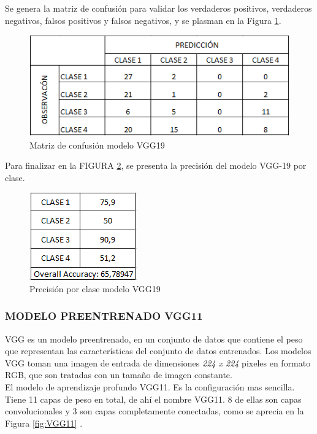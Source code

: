 			Se genera la matriz de confusión para validar los verdaderos positivos, verdaderos negativos, falsos positivos y falsos negativos, y se plasman en la Figura \ref{fig:MC_VGG19}.
		
			\begin{figure}[ht]
				\centering
				\includegraphics[scale=0.5]{Figs/131.png}
				\caption{Matriz de confusión modelo VGG19}
				\label{fig:MC_VGG19}
			\end{figure}
			
			Para finalizar en la FIGURA \ref{fig:ACU_VGG19}, se presenta la precisión del modelo VGG-19 por clase.
		
			\begin{figure}[ht]
				\centering
				\includegraphics[scale=0.6]{Figs/132.png}
				\caption{Precisión por clase modelo VGG19}
				\label{fig:ACU_VGG19}
			\end{figure}
		
			\newpage
			\subsubsection{\MakeUppercase{Modelo preentrenado VGG11}}
			VGG es un modelo preentrenado, en un conjunto de datos que contiene el peso que representan las características del conjunto de datos entrenados. Los modelos VGG toman una imagen de entrada de dimensiones \textit{224 x 224} pixeles en formato RGB, que son tratadas con un tamaño de imagen constante.\\
			
			 El modelo de aprendizaje profundo VGG11. Es la configuración mas sencilla. Tiene 11 capas de peso en total, de ahí el nombre VGG11. 8 de ellas son capas convolucionales y 3 son capas completamente conectadas, como se aprecia en la Figura \ref{fig:VGG11} \cite{ref_3}.
			
